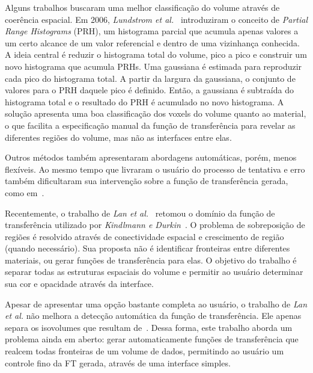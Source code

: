 	Alguns trabalhos buscaram uma melhor classificação do volume através de coerência espacial. Em 2006, \textit{Lundstrom et al.}~\cite{lundstrom1} introduziram o conceito de \textit{Partial Range Histograms} (PRH), um histograma parcial que acumula apenas valores a um certo alcance de um valor referencial e dentro de uma vizinhança conhecida. A ideia central é reduzir o histograma total do volume, pico a pico e construir um novo histograma que acumula PRHs. Uma gaussiana é estimada para reproduzir cada pico do histograma total. A partir da largura da gaussiana, o conjunto de valores para o PRH daquele pico é definido. Então, a gaussiana é subtraída do histograma total e o resultado do PRH é acumulado no novo histograma. A solução apresenta uma boa classificação dos voxels do volume quanto ao material, o que facilita a especificação manual da função de transferência para revelar as diferentes regiões do volume, mas não as interfaces entre elas.
	
	Outros métodos também apresentaram abordagens automáticas, porém, menos flexíveis. Ao mesmo tempo que livraram o usuário do processo de tentativa e erro também dificultaram sua intervenção sobre a função de transferência gerada, como em~\cite{ruiz, zhou}.
	
	Recentemente, o trabalho de \textit{Lan et al.}~\cite{lan} retomou o domínio da função de transferência utilizado por \textit{Kindlmann e Durkin}~\cite{gordon}. O problema de sobreposição de regiões é resolvido através de conectividade espacial e crescimento de região (quando necessário). Sua proposta não é identificar fronteiras entre diferentes materiais, ou gerar funções de transferência para elas. O objetivo do trabalho é separar todas as estruturas espaciais do volume e permitir ao usuário determinar sua cor e opacidade através da interface.
	
	Apesar de apresentar uma opção bastante completa ao usuário, o trabalho de \textit{Lan et al.} não melhora a detecção automática da função de transferência. Ele apenas separa os isovolumes que resultam de~\cite{gordon, kniss1, kniss2}. Dessa forma, este trabalho aborda um problema ainda em aberto: gerar automaticamente funções de transferência que realcem todas fronteiras de um volume de dados, permitindo ao usuário um controle fino da FT gerada, através de uma interface simples.